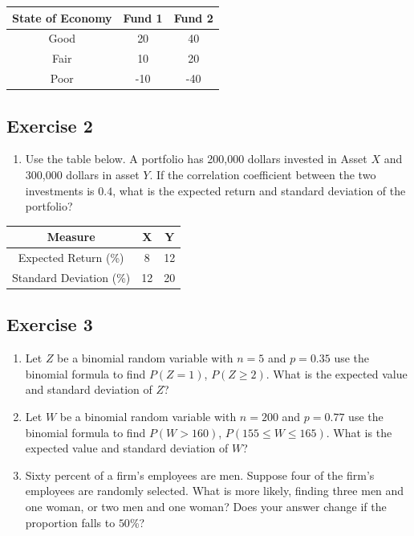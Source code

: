 \documentclass[
  letterpaper,
  DIV=11,
  numbers=noendperiod]{scrreprt}
\providecommand{\tightlist}{%
  \setlength{\itemsep}{0pt}\setlength{\parskip}{0pt}}\usepackage{longtable,booktabs,array}
\begin{document}
\begin{longtable}[]{@{}ccc@{}}
\toprule()
State of Economy & Fund 1 & Fund 2 \\
\midrule()
\endhead
Good & 20 & 40 \\
Fair & 10 & 20 \\
Poor & -10 & -40 \\
\bottomrule()
\end{longtable}

\hypertarget{exercise-2-16}{%
\subsection*{Exercise 2}\label{exercise-2-16}}

\begin{enumerate}
\def\labelenumi{\arabic{enumi}.}
\tightlist
\item
  Use the table below. A portfolio has 200,000 dollars invested in Asset
  \(X\) and 300,000 dollars in asset \(Y\). If the correlation
  coefficient between the two investments is \(0.4\), what is the
  expected return and standard deviation of the portfolio?
\end{enumerate}

\begin{longtable}[]{@{}ccc@{}}
\toprule()
Measure & X & Y \\
\midrule()
\endhead
Expected Return (\%) & 8 & 12 \\
Standard Deviation (\%) & 12 & 20 \\
\bottomrule()
\end{longtable}

\hypertarget{exercise-3-16}{%
\subsection*{Exercise 3}\label{exercise-3-16}}

\begin{enumerate}
\def\labelenumi{\arabic{enumi}.}
\item
  Let \(Z\) be a binomial random variable with \(n=5\) and \(p=0.35\)
  use the binomial formula to find \(P(Z=1)\), \(P(Z \geq 2)\). What is
  the expected value and standard deviation of \(Z\)?
\item
  Let \(W\) be a binomial random variable with \(n=200\) and \(p=0.77\)
  use the binomial formula to find \(P(W>160)\),
  \(P(155 \leq W \leq 165)\). What is the expected value and standard
  deviation of \(W\)?
\item
  Sixty percent of a firm's employees are men. Suppose four of the
  firm's employees are randomly selected. What is more likely, finding
  three men and one woman, or two men and one woman? Does your answer
  change if the proportion falls to \(50\)\%?
\end{enumerate}
\end{document}
